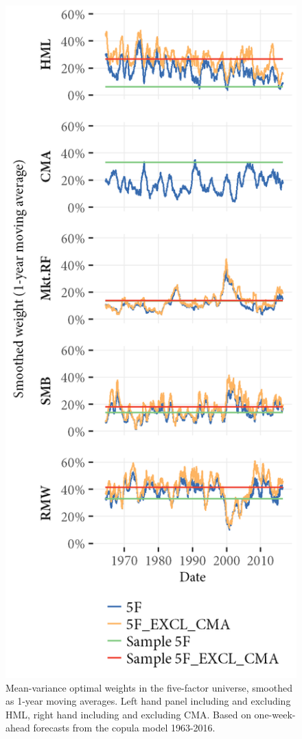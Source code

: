 \begin{figure}[htbp]
\begin{minipage}{\textwidth}
  \includegraphics[scale = 1]{graphics/Weights_5F_EXCL_CMA_5F.png} \\
  \vspace{3mm}
  \footnotesize
  Mean-variance optimal weights in the five-factor universe, smoothed as 1-year moving averages. Left hand panel including and excluding HML, right hand including and excluding CMA. Based on one-week-ahead forecasts from the copula model 1963-2016.
  \end{minipage}
\end{figure}

